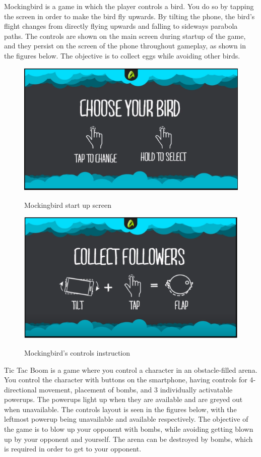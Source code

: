 Mockingbird is a game in which the player controls a bird. You do so by tapping the screen in order to make the bird fly upwards. By tilting the phone, the bird’s flight changes from directly flying upwards and falling to sideways parabola paths. The controls are shown on the main screen during startup of the game, and they persist on the screen of the phone throughout gameplay, as shown in the figures below. The objective is to collect eggs while avoiding other birds.
\begin{figure}
\centering
\includegraphics[width=\textwidth]{figures/birdSelect} \label{fig:MBird1}
\caption{Mockingbird start up screen}
\end{figure}
\begin{figure}
\centering
\includegraphics[width=\textwidth]{figures/birdPlay} \label{fig:MBird2}
\caption{Mockingbird's controls instruction}
\end{figure}

Tic Tac Boom is a game where you control a character in an obstacle-filled arena. You control the character with buttons on the smartphone, having controls for 4-directional movement, placement of bombs, and 3 individually activatable powerups. The powerups light up when they are available and are greyed out when unavailable. The controls layout is seen in the figures below, with the leftmost powerup being unavailable and available respectively. The objective of the game is to blow up your opponent with bombs, while avoiding getting blown up by your opponent and yourself. The arena can be destroyed by bombs, which is required in order to get to your opponent.

